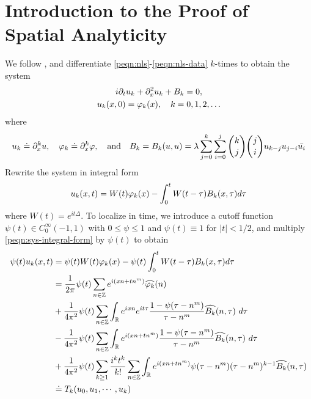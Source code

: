 \section{Introduction to the Proof of Spatial Analyticity} 
\label{psec:space-anal}
We follow \cite{Gorsky:2005kx}, and differentiate
\eqref{peqn:nls}-\eqref{peqn:nls-data} $k$-times to obtain the system
%
%
\begin{gather}
  i \partial_t u_k + \partial^2_x u_k + B_{k}= 0, 
  \label{peqn:nls-system}
  \\
  u_{k}(x,0) = \varphi_k(x), \quad k=0,1,2,\ldots
  \label{peqn:nls-system-init-data}
\end{gather}
%
%
where
\begin{gather*}
  u_k \doteq \partial_x^k u, \quad \varphi_k \doteq \partial_x^k \varphi, \quad \text{and}
  \quad B_k = B_{k}(u,u) =
  \lambda \sum_{j=0}^{k} \sum_{i=0}^{j} {k \choose j}{j \choose i} u_{k-j} u_{j-i}
  \bar{u_i}
  \label{peqn:system-notat}
\end{gather*}
Rewrite the system in integral form
%
%
\begin{equation}
\begin{split}
  u_k(x,t) = W(t) \varphi_{k}(x) - \int_{0}^{t} W(t- \tau)B_{k}(x, \tau) d \tau
  \label{peqn:sys-integral-form}
\end{split}
\end{equation}
%
%
where $W(t) = e^{it \Delta}$. To localize in time, we introduce a cutoff
function $\psi(t) \in C^{\infty}_{0}(-1,1)$ with $0 \le \psi \le 1$ and
$\psi(t) \equiv 1$ for $| t | < 1/2$, and multiply \eqref{peqn:sys-integral-form}
by $\psi(t)$ to obtain
%
%
\begin{align}
\psi(t) u_k(x,t)
& = \psi(t) W(t) \varphi_{k}(x) - \psi(t) \int_{0}^{t} W(t-
\tau)B_{k}(x, \tau) d \tau \notag
\\
\label{pmain-int-expression-1}
    & = \frac{1}{2 \pi} \psi(t) \sum_{n \in \mathbb{Z}} e^{i(xn + tn^{m 
    })} \widehat{\varphi_k}(n) 
    \\
    & + \frac{1}{4 \pi^2} \psi(t) \sum_{n\in \mathbb{Z}} \int_{\mathbb{R}} e^{ixn}  
    e^{it \tau} \frac{ 1 - \psi(\tau -  n^m) 
    }{\tau -  n^m} \widehat{B_k}(n, \tau) \ d \tau
    \label{pmain-int-expression-2}
    \\
    \label{pmain-int-expression-3}
    & - \frac{1}{4 \pi^2} \psi(t) \sum_{n\in \mathbb{Z}} \int_{\mathbb{R}} e^{i(xn + 
    t n^m)}
     \frac{1- \psi(\tau -  n^m)}{\tau -  n^m} \widehat{B_k}(n, \tau) \ d \tau
    \\
    \label{pmain-int-expression-4}
    & + \frac{1}{4 \pi^2} \psi(t) \sum_{k \ge 1} \frac{i^k t^k}{k!}
    \sum_{n \in \mathbb{Z}} \int_{\mathbb{R}} e^{i(xn + t n^m )}
    \psi(\tau -  n^m) (\tau -  n^m)^{k-1} \widehat{B_k}(n, \tau)  
    \\
    & \doteq T_k(u_0, u_1,\cdots,u_k) \notag
\end{align}
